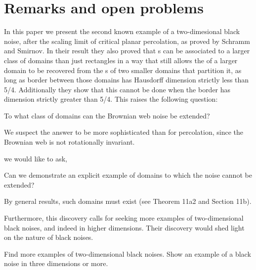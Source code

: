 {
\section{Remarks and open problems}

\label{sec:open-problems}

In this paper we present the second known example of a two-dimesional
black noise, after the scaling limit of critical planar percolation,
as proved by Schramm and Smirnov.  In their result they also proved
that \sigfield{}s can be associated to a larger class of domains than
just rectangles in a way that still allows the \sigfield{} of a larger
domain to be recovered from the \sigfield{}s of two smaller domains
that partition it, as long as border between those domains has
Hausdorff dimension strictly less than 5/4.
Additionally they show that this cannot be done when the border has
dimension strictly greater than 5/4.
This raises the following question:

\begin{openproblem}
  To what class of domains can the Brownian web noise be extended?
\end{openproblem}

We suspect the answer to be more sophisticated than for percolation,
since the Brownian web is not rotationally invariant.  

 we would like to ask,

\begin{openproblem}
  Can we demonstrate an explicit example of domains to which the noise
  cannot be extended?
\end{openproblem}

By general results, such domains must exist (see
\cite{tsirelson-nonclassical-stochastic-flows} Theorem 11a2 and
Section 11b).

Furthermore, this discovery calls for seeking more examples of
two-dimen\-sional black noises, and indeed in higher dimensions.  Their
discovery would shed light on the nature of black noises.

\begin{openproblem}
  Find more examples of two-dimensional black noises.  Show an example
  of a black noise in three dimensions or more.
\end{openproblem}
}
